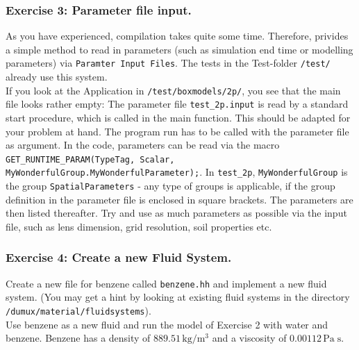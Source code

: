 \subsubsection{Exercise 3: Parameter file input.}
As you have experienced, compilation takes quite some time. Therefore,  privides a simple method to read in parameters (such as simulation end time or modelling parameters) via \texttt{Paramter Input Files}. The tests in the Test-folder \texttt{/test/} already use this system.\\
If you look at the Application in \texttt{/test/boxmodels/2p/}, you see that the main file looks rather empty: The parameter file \texttt{test\_2p.input} is read by a standard start procedure, which is called in the main function. This should be adapted for your problem at hand. The program run has to be called with the parameter file as argument.
In the code, parameters can be read via the macro \texttt{GET\_RUNTIME\_PARAM(TypeTag, Scalar, MyWonderfulGroup.MyWonderfulParameter);}. In \texttt{test\_2p}, \texttt{MyWonderfulGroup} is the group \texttt{SpatialParameters} - any type of groups is applicable, if the group definition in the parameter file is enclosed in square brackets. The parameters are then listed thereafter. Try and use as much parameters as possible via the input file, such as lens dimension, grid resolution, soil properties etc.


\subsubsection{Exercise 4: Create a new Fluid System.}

Create a new file for benzene called \texttt{benzene.hh} and implement
a new fluid system. (You may get a hint by looking at existing fluid 
systems in the directory \verb+/dumux/material/fluidsystems+). \\
Use benzene as a new fluid and run the model of Exercise 2 with water
and benzene. Benzene has a density of $889.51 \, \text{kg} / \text{m}^3$
and a viscosity of $0.00112 \, \text{Pa} \; \text{s}$. 

\clearpage \newpage
